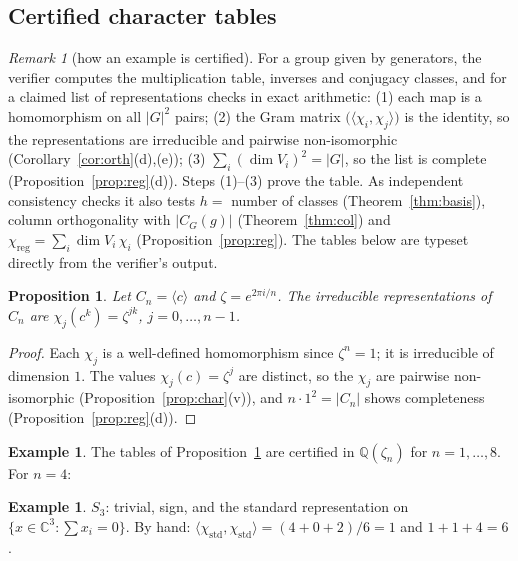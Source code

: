 \documentclass[11pt]{article}
\newtheorem{proposition}[theorem]{Proposition}
\theoremstyle{definition}
\newtheorem{example}[theorem]{Example}
\theoremstyle{remark}
\newtheorem{remark}{Remark}
\newcommand{\claim}[1]{\leavevmode\marginpar{\raggedright\scriptsize\texttt{#1}}}
\newcommand{\C}{\mathbb{C}}
\newcommand{\Q}{\mathbb{Q}}
\newcommand{\ip}[2]{\langle #1, #2\rangle}
\begin{document}
\subsection{Certified character tables}
\begin{remark}[how an example is certified]\label{rem:cert}
For a group given by generators, the verifier computes the multiplication table, inverses and conjugacy classes, and
for a claimed list of representations checks in exact arithmetic: (1) each map is a homomorphism on all $|G|^2$ pairs;
(2) the Gram matrix $\big(\ip{\chi_i}{\chi_j}\big)$ is the identity, so the representations are irreducible and pairwise
non-isomorphic (Corollary~\ref{cor:orth}(d),(e)); (3) $\sum_i(\dim V_i)^2=|G|$, so the list is complete
(Proposition~\ref{prop:reg}(d)). Steps (1)--(3) prove the table. As independent consistency checks it also tests
$h=$ number of classes (Theorem~\ref{thm:basis}), column orthogonality with $|C_G(g)|$ (Theorem~\ref{thm:col}) and
$\chi_{\mathrm{reg}}=\sum_i\dim V_i\,\chi_i$ (Proposition~\ref{prop:reg}). The tables below are typeset directly from the
verifier's output.
\end{remark}

\begin{proposition}\label{prop:cn}\claim{P-3}
Let $C_n=\langle c\rangle$ and $\zeta=e^{2\pi i/n}$. The irreducible representations of $C_n$ are $\chi_j(c^k)=\zeta^{jk}$,
$j=0,\dots,n-1$.
\end{proposition}
\begin{proof}
Each $\chi_j$ is a well-defined homomorphism since $\zeta^n=1$; it is irreducible of dimension $1$. The values $\chi_j(c)=\zeta^j$
are distinct, so the $\chi_j$ are pairwise non-isomorphic (Proposition~\ref{prop:char}(v)), and $n\cdot1^2=|C_n|$ shows
completeness (Proposition~\ref{prop:reg}(d)).
\end{proof}

\begin{example}\label{ex:cn}\claim{E-C1, E-C2, E-C3, E-C4, E-C5, E-C6, E-C7, E-C8}
The tables of Proposition~\ref{prop:cn} are certified in $\Q(\zeta_n)$ for $n=1,\dots,8$. For $n=4$:
\begin{center}\end{center}
\end{example}

\begin{example}\label{ex:s3}\claim{E-S3}
$S_3$: trivial, sign, and the standard representation on $\{x\in\C^3:\sum x_i=0\}$. By hand:
$\ip{\chi_{\mathrm{std}}}{\chi_{\mathrm{std}}}=(4+0+2)/6=1$ and $1+1+4=6$.
\begin{center}\end{center}
\end{example}
\end{document}
